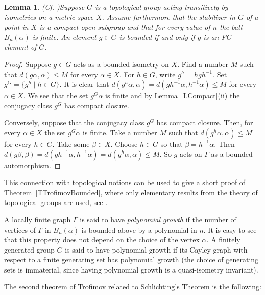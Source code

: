 \documentclass{emsprocart}
\newtheorem{lemma}[theorem]{Lemma}
\theoremstyle{definition}
\begin{document}
\begin{lemma}
{\rm (Cf. \cite[Lemma 4]{Woess1992})}\label{LWoessBounded}
Suppose $G$ is a topological group acting transitively
by isometries on a metric space $X$.  Assume furthermore that the
stabilizer in $G$ of a point in $X$ is a compact open subgroup and
that for every value of $n$ the ball
$B_n(\alpha)$ is finite.
An element $g\in G$  is bounded if and only if $g$ is an
FC\/$^-$-element of $G$.
\end{lemma}

\begin{proof}  Suppose $g\in G$ acts as a bounded isometry on $X$.
Find a number $M$ such that $d(g\alpha,\alpha)\leq M$ for every
$\alpha\in X$.
For $h\in G$, write $g^h=hgh^{-1}$.  Set $g^G=\{g^h\mid h\in G\}$.
It is clear that
$d(g^h\alpha ,\alpha)=d(gh^{-1}\alpha , h^{-1}\alpha)\leq M$
for every $\alpha\in X$.
   We see that the set
$g^G\alpha$ is finite and by Lemma~\ref{LCompact}(ii)
the conjugacy class $g^G$ has compact
closure.

Conversely, suppose that the conjugacy class
$g^G$ has compact closure.  Then, for every $\alpha\in X$
the set $g^G\alpha$ is finite.  Take a number $M$
such that $d(g^h\alpha,\alpha)\leq M$
for every $h\in G$.  Take some $\beta\in X$.
Choose $h\in G$ so that $\beta =h^{-1}\alpha$.  Then
$d(g\beta,\beta)=d(gh^{-1}\alpha, h^{-1}\alpha)=
d(g^h\alpha,\alpha)\leq M$.  So $g$ acts on $\Gamma$ as a
bounded automorphism.    \end{proof}

\medskip

This connection with topological notions
can be used to give a short proof of Theorem~\ref{TTrofimovBounded},
where only elementary results from the
theory of topological groups are used, see \cite{Moller1998}.

\bigskip

A locally finite graph $\Gamma$ is said to have {\em polynomial
  growth} if the number of vertices of $\Gamma$ in 
$B_n(\alpha)$ is bounded above by a polynomial in $n$.
It is easy to see that this property does not depend on the choice of
the vertex $\alpha$.
A finitely generated group $G$ is said to have polynomial growth if
its Cayley graph with respect to a finite generating set
has polynomial growth (the choice of
generating sets is immaterial, since having polynomial growth is a
quasi-isometry invariant).

The second theorem of Trofimov related to Schlichting's Theorem
is the following:
\end{document}

